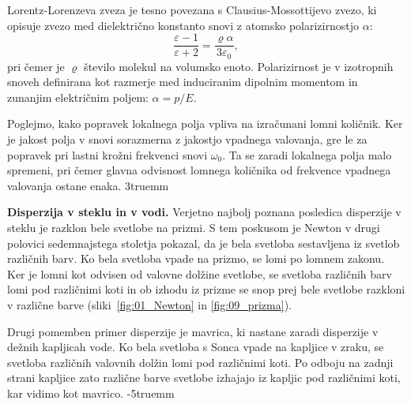 \begin{remark}
 Lorentz-Lorenzeva zveza je tesno povezana s Clausius-Mossottijevo zvezo, ki opisuje
 zvezo med dielektrično konstanto snovi z atomsko polarizirnostjo $\alpha$:
 \begin{equation}
\frac{\varepsilon -1 }{\varepsilon+2} = \frac{\varrho\alpha}{3 \varepsilon_0},
\label{eq:09_35a}
\end{equation}
pri čemer je $\varrho$ število molekul na volumsko enoto. Polarizirnost je v izotropnih
snoveh definirana kot razmerje med induciranim dipolnim momentom in zunanjim električnim
poljem: $\alpha = p/E$.
\end{remark}

Poglejmo, kako popravek lokalnega polja vpliva na izračunani lomni količnik. Ker je
jakost polja v snovi sorazmerna z jakostjo vpadnega valovanja, gre le za popravek
pri lastni krožni frekvenci snovi $\omega_0$. Ta se zaradi lokalnega polja malo
spremeni, pri čemer glavna odvisnost lomnega količnika od frekvence vpadnega
valovanja ostane enaka.
\vglue3truemm
\begin{example}{\bf Disperzija v steklu in v vodi.}
Verjetno najbolj poznana posledica disperzije v steklu je razklon bele svetlobe
na prizmi. S tem poskusom je Newton v drugi polovici sedemnajstega stoletja
pokazal, da je bela svetloba sestavljena iz svetlob različnih barv. Ko bela
svetloba vpade na prizmo, se lomi po lomnem zakonu. Ker je lomni kot odvisen
od valovne dolžine svetlobe, se svetloba različnih barv lomi pod različnimi
koti in ob izhodu iz prizme se snop prej bele svetlobe razkloni v različne
barve (sliki~\ref{fig:01_Newton} in \ref{fig:09_prizma}).

Drugi pomemben primer disperzije je mavrica, ki nastane zaradi
disperzije v dežnih kapljicah vode. Ko bela svetloba s Sonca vpade
na kapljice v zraku, se svetloba različnih valovnih dolžin 
lomi pod različnimi koti. Po odboju na zadnji strani kapljice 
zato različne barve svetlobe izhajajo iz kapljic pod različnimi koti, 
kar vidimo kot mavrico.
\vglue-5truemm
\end{example}

